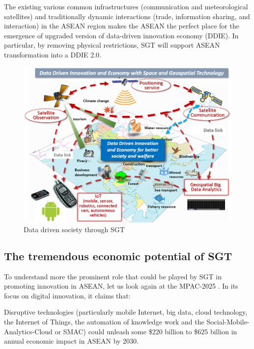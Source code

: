 The existing various common infrastructures (communication and meteorological satellites) and traditionally dynamic interactions (trade, information sharing, and interaction) in the ASEAN region makes the ASEAN the perfect place for the emergence of upgraded version of data-driven innovation economy (DDIE). In particular, by removing physical restrictions, SGT will support ASEAN transformation into a DDIE 2.0.

\begin{figure}[H]
\begin{center}
\includegraphics[width = 0.8\linewidth]{Figures/data_driven.png}
\end{center}
\caption{Data driven society through SGT}
\label{data_driven}
\end{figure}

\subsection{The tremendous economic potential of SGT}

\tab To understand more the prominent role that could be played by SGT in promoting innovation in ASEAN, let us look again at the MPAC-2025 \cite{mpac}. In its focus on digital innovation, it claims that:

\begin{displayquote}

Disruptive technologies (particularly mobile Internet, big data, cloud technology, the Internet of Things, the automation of knowledge work and the Social-Mobile-Analytics-Cloud or SMAC) could unleash some \$220 billion to \$625 billion in annual economic impact in ASEAN by 2030.

\end{displayquote}


